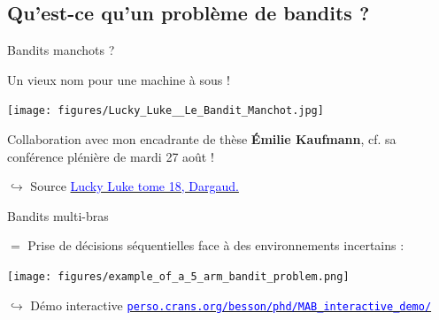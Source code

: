 \documentclass[11pt,french,ignorenonframetext,]{beamer}
\begin{document}
\subsection{\hfill{}Qu'est-ce qu'un problème de bandits ?\hfill{}}

\begin{frame}{Bandits manchots ?}

  Un vieux nom pour une machine à sous !

  \begin{center}
    \texttt{[image: figures/Lucky\_Luke\_\_Le\_Bandit\_Manchot.jpg]}
  \end{center}

  Collaboration avec mon encadrante de thèse \textbf{Émilie Kaufmann}, cf. sa conférence plénière de mardi 27 août !

  \begin{tiny}
  $\hookrightarrow$ Source
    \href{https://www.dargaud.com/bd/LUCKY-LUKE/Lucky-Luke/Lucky-Luke-tome-18-Bandit-manchot-Le}{\textcolor{blue}{Lucky Luke tome 18, \textcopyright{} Dargaud.}}
  \end{tiny}

\end{frame}


\begin{frame}{Bandits multi-bras}

  $=$ Prise de décisions séquentielles face à des environnements incertains :

  \begin{center}
    \texttt{[image: figures/example\_of\_a\_5\_arm\_bandit\_problem.png]}
  \end{center}

  \begin{tiny}
  $\hookrightarrow$ Démo interactive
    \href{https://perso.crans.org/besson/phd/MAB_interactive_demo/}{\textcolor{blue}{\texttt{perso.crans.org/besson/phd/MAB\_interactive\_demo/}}}
  \end{tiny}

\end{frame}
\end{document}
